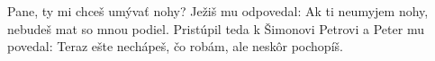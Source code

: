 Pane, ty mi chceš umývať nohy?
Ježiš mu odpovedal: Ak ti neumyjem nohy, nebudeš mat so mnou podiel. 
\versseparator
Pristúpil teda k Šimonovi Petrovi a Peter mu povedal: 
\versseparator
Teraz ešte nechápeš, čo robám, ale neskôr pochopíš.